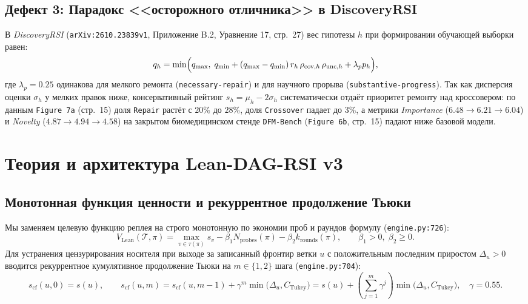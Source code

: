 \documentclass[11pt,a4paper]{article}
\begin{document}
\subsection{Дефект 3: Парадокс <<осторожного отличника>> в DiscoveryRSI}
В \emph{DiscoveryRSI} (\texttt{arXiv:2610.23839v1}, Приложение B.2, Уравнение 17, стр.~27) вес гипотезы $h$ при формировании обучающей выборки равен:
\begin{equation}
q_h = \min\Bigl(q_{\max}, \; q_{\min} + (q_{\max} - q_{\min})\, r_h \, \rho_{\text{cov}, h}\, \rho_{\text{unc}, h} + \lambda_p p_h\Bigr),
\end{equation}
где $\lambda_p = 0.25$ одинакова для мелкого ремонта (\texttt{necessary-repair}) и для научного прорыва (\texttt{substantive-progress}). Так как дисперсия оценки $\sigma_h$ у мелких правок ниже, консервативный рейтинг $s_h = \mu_h - 2\sigma_h$ систематически отдаёт приоритет ремонту над кроссовером: по данным \texttt{Figure 7a} (стр.~15) доля \texttt{Repair} растёт с $20\%$ до $28\%$, доля \texttt{Crossover} падает до $3\%$, а метрики \emph{Importance} ($6.48 \to 6.21 \to 6.04$) и \emph{Novelty} ($4.87 \to 4.94 \to 4.58$) на закрытом биомедицинском стенде \texttt{DFM-Bench} (\texttt{Figure 6b}, стр.~15) падают ниже базовой модели.

\section{Теория и архитектура Lean-DAG-RSI v3}

\subsection{Монотонная функция ценности и рекуррентное продолжение Тьюки}
Мы заменяем целевую функцию реплея на строго монотонную по экономии проб и раундов формулу (\texttt{engine.py:726}):
\begin{equation}
V_{\text{Lean}}(\mathcal{T}, \pi) = \max_{v \in \tau(\pi)} s_v - \beta_1 N_{\text{probes}}(\pi) - \beta_2 k_{\text{rounds}}(\pi), \qquad \beta_1 > 0, \; \beta_2 \ge 0.
\end{equation}
Для устранения цензурирования носителя при выходе за записанный фронтир ветки $u$ с положительным последним приростом $\Delta_u > 0$ вводится рекуррентное кумулятивное продолжение Тьюки на $m \in \{1, 2\}$ шага (\texttt{engine.py:704}):
\begin{equation}
s_{\text{cf}}(u, 0) = s(u), \qquad s_{\text{cf}}(u, m) = s_{\text{cf}}(u, m-1) + \gamma^m \min\bigl(\Delta_u, C_{\text{Tukey}}\bigr) = s(u) + \left(\sum_{j=1}^m \gamma^j\right) \min\bigl(\Delta_u, C_{\text{Tukey}}\bigr), \quad \gamma = 0.55.
\end{equation}
\end{document}
